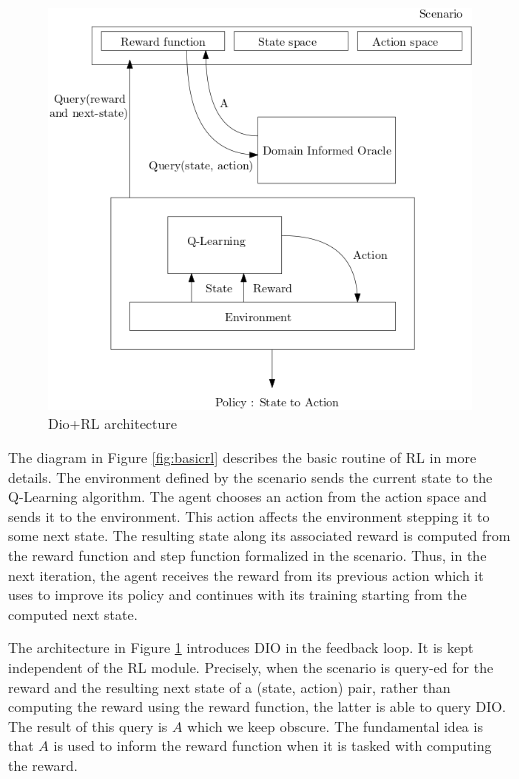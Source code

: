 \begin{figure}[H]
  \centering
  \includegraphics[scale=0.42]{figures/dio.png}
  \caption{Dio+RL architecture}
  \label{fig:diorl}
\end{figure}

The diagram in Figure \ref{fig:basicrl} describes the basic routine of RL in more details. The environment defined by the scenario sends the current state 
to the Q-Learning algorithm. The agent chooses an action from the action space and sends it to the environment. This action affects the environment stepping it to some next state. 
The resulting state along its associated reward is computed from the reward function and step function formalized in the scenario. Thus, in the next iteration, the 
agent receives the reward from its previous action which it uses to improve its policy and continues with its training starting from the computed next state.  

\medskip 

The architecture in Figure \ref{fig:diorl} introduces DIO in the feedback loop. It is kept independent of the RL module. Precisely, when the scenario is query-ed for the reward and 
the resulting next state of a (state, action) pair, rather than computing the reward using the reward function, the latter is able to query DIO. The result of this query is $A$ which we keep 
obscure. The fundamental idea is that $A$ is used to inform the reward function when it is tasked with computing the reward. 


